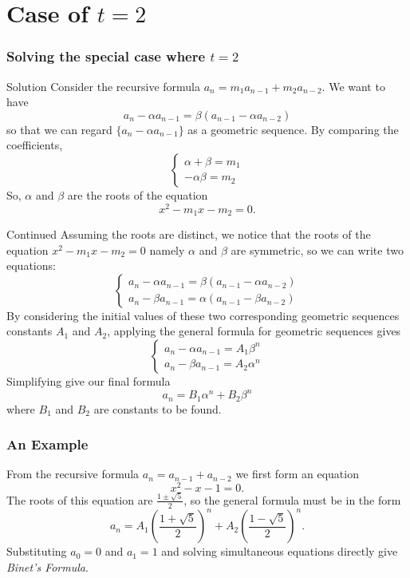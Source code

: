 \documentclass{beamer}
\theoremstyle{definition}
\theoremstyle{remark}
\begin{document}
\section{Case of $t = 2$}
\begin{frame}
  \frametitle{Solving the special case where $t = 2$}
  \begin{block}{Solution}
    Consider the recursive formula $a_n = m_1 a_{n-1} + m_2 a_{n-2}$. We want 
    to have \[
      a_n - \alpha a_{n-1} = \beta (a_{n-1} - \alpha a_{n-2})
    \]
    so that we can regard $\{a_n - \alpha a_{n-1}\}$ as a 
    geometric sequence. 
    By comparing the coefficients,
    \[
      \begin{cases}
         \alpha + \beta = m_1 \\
         -\alpha\beta = m_2
      \end{cases}
    \]
    So, $\alpha$ and $\beta$ are the roots of the equation \[
      x^2 - m_1 x -m_2 = 0. 
    \] 
  \end{block}
\end{frame}
\begin{frame}
  \begin{block}{Continued}
    Assuming the roots are distinct, we notice that 
    the roots of the equation $x^2 - m_1 x -m_2 = 0$ namely $\alpha$ 
    and $\beta$ are symmetric, so we can write two equations:
    \[
      \begin{cases}
        a_n - \alpha a_{n-1} = \beta (a_{n-1} - \alpha a_{n-2}) \\
        a_n - \beta a_{n-1} = \alpha (a_{n-1} - \beta a_{n-2})
      \end{cases}
    \]
    By considering the initial values of these two 
    corresponding geometric sequences constants $A_1$ and $A_2$, applying
    the general formula for geometric sequences gives \[
      \begin{cases}
        a_n - \alpha a_{n-1} = A_1 \beta^n \\
        a_n - \beta a_{n-1} = A_2 \alpha^n 
      \end{cases}
    \]
    Simplifying give our final formula \[
      a_n = B_1 \alpha^n + B_2 \beta^n
    \]
    where $B_1$ and $B_2$ are constants to be found.
  \end{block}
\end{frame}
\begin{frame}
  \frametitle{An Example}
  \begin{examples}[Fibonacci]
    From the recursive formula $a_n = a_{n-1} + a_{n-2}$ we first 
    form an equation \[
      x^2 - x - 1 = 0.
    \]
    The roots of this equation are $\frac{1 \pm \sqrt{5}}{2}$, 
    so the general formula must be in the form \[
      a_n = A_1 \left(\frac{1+\sqrt{5}}{2}\right)^n
      + A_2 \left(\frac{1-\sqrt{5}}{2}\right)^n.
    \]
    Substituting $a_0 = 0$ and $a_1 = 1$ and solving 
    simultaneous equations directly give 
    \emph{Binet's Formula}.
   \end{examples}
\end{frame}
\end{document}
